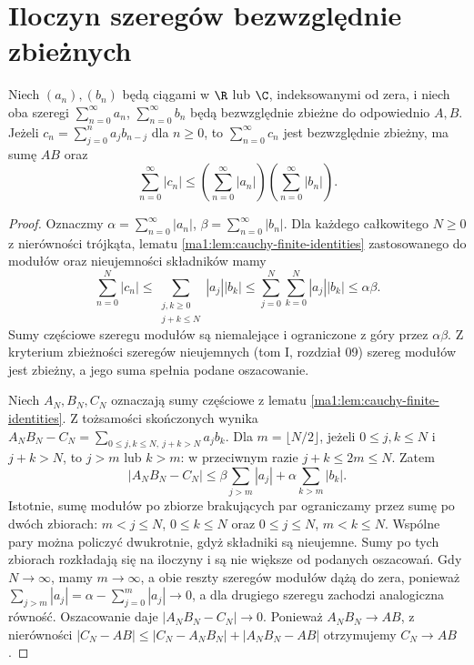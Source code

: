 \section{Iloczyn szeregów bezwzględnie zbieżnych}
\begin{twierdzenie}
\label{ma1:thm:absolute-cauchy-product}
Niech $(a_n),(b_n)$ będą ciągami w $\R$ lub $\C$, indeksowanymi od zera, i niech oba szeregi $\sum_{n=0}^\infty a_n$, $\sum_{n=0}^\infty b_n$ będą bezwzględnie zbieżne do odpowiednio $A,B$. Jeżeli $c_n=\sum_{j=0}^n a_jb_{n-j}$ dla $n\ge0$, to $\sum_{n=0}^\infty c_n$ jest bezwzględnie zbieżny, ma sumę $AB$ oraz
\[
 \sum_{n=0}^\infty |c_n|
 \le \left(\sum_{n=0}^\infty |a_n|\right)
      \left(\sum_{n=0}^\infty |b_n|\right).
\]
\end{twierdzenie}
\begin{proof}
Oznaczmy $\alpha=\sum_{n=0}^\infty|a_n|$, $\beta=\sum_{n=0}^\infty|b_n|$. Dla każdego całkowitego $N\ge0$ z nierówności trójkąta, lematu \ref{ma1:lem:cauchy-finite-identities} zastosowanego do modułów oraz nieujemności składników mamy
\[
 \sum_{n=0}^N|c_n|\le
 \sum_{\substack{j,k\ge0\\j+k\le N}}|a_j||b_k|
 \le \sum_{j=0}^N\sum_{k=0}^N |a_j||b_k|
 \le\alpha\beta.
\]
Sumy częściowe szeregu modułów są niemalejące i ograniczone z góry przez $\alpha\beta$. Z kryterium zbieżności szeregów nieujemnych (tom I, rozdział 09) szereg modułów jest zbieżny, a jego suma spełnia podane oszacowanie.

Niech $A_N,B_N,C_N$ oznaczają sumy częściowe z lematu \ref{ma1:lem:cauchy-finite-identities}. Z tożsamości skończonych wynika $A_NB_N-C_N=\sum_{0\le j,k\le N,\ j+k>N}a_jb_k$. Dla $m=\lfloor N/2\rfloor$, jeżeli $0\le j,k\le N$ i $j+k>N$, to $j>m$ lub $k>m$: w przeciwnym razie $j+k\le2m\le N$. Zatem
\[
 |A_NB_N-C_N|
 \le \beta\sum_{j>m}|a_j|+
      \alpha\sum_{k>m}|b_k|.
\]
Istotnie, sumę modułów po zbiorze brakujących par ograniczamy przez sumę po dwóch zbiorach: $m<j\le N$, $0\le k\le N$ oraz $0\le j\le N$, $m<k\le N$. Wspólne pary można policzyć dwukrotnie, gdyż składniki są nieujemne. Sumy po tych zbiorach rozkładają się na iloczyny i są nie większe od podanych oszacowań. Gdy $N\to\infty$, mamy $m\to\infty$, a obie reszty szeregów modułów dążą do zera, ponieważ $\sum_{j>m}|a_j|=\alpha-\sum_{j=0}^{m}|a_j|\to0$, a dla drugiego szeregu zachodzi analogiczna równość. Oszacowanie daje $|A_NB_N-C_N|\to0$. Ponieważ $A_NB_N\to AB$, z nierówności $|C_N-AB|\le |C_N-A_NB_N|+|A_NB_N-AB|$ otrzymujemy $C_N\to AB$.
\end{proof}

